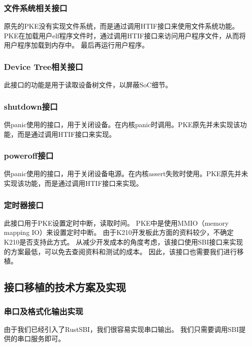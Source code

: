 \subsubsection{文件系统相关接口}

原先的PKE没有实现文件系统，而是通过调用HTIF接口来使用文件系统功能。
PKE在加载用户elf程序文件时，通过调用HTIF接口来访问用户程序文件，从而将用户程序加载到内存中。
最后再运行用户程序。

\subsubsection{Device Tree相关接口}

此接口的功能是用于读取设备树文件，以屏蔽SoC细节。

\subsubsection{shutdown接口}

供panic使用的接口，用于关闭设备。在内核panic时调用。PKE原先并未实现该功能，而是通过调用HTIF接口来实现。

\subsubsection{poweroff接口}

供panic使用的接口，用于关闭设备电源。在内核assert失败时使用。PKE原先并未实现该功能，而是通过调用HTIF接口来实现。

\subsubsection{定时器接口}

此接口用于PKE设置定时中断，读取时间。
PKE中是使用MMIO（memory mapping IO）来设置定时中断。
由于K210开发板此方面的资料较少，不确定K210是否支持此方式。
从减少开发成本的角度考虑，该接口使用SBI接口来实现的方案最低，可以免去查阅资料和测试的成本。
因此，该接口也需要我们进行移植。

\subsection{接口移植的技术方案及实现}

\subsubsection{串口及格式化输出实现}

由于我们已经引入了RustSBI，我们很容易实现串口输出。
我们只需要调用SBI提供的串口服务即可。

